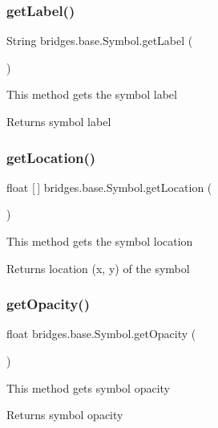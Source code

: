 \subsubsection{\texorpdfstring{getLabel()}{getLabel()}}
{\footnotesize\ttfamily String bridges.\+base.\+Symbol.\+get\+Label (\begin{DoxyParamCaption}{ }\end{DoxyParamCaption})}

This method gets the symbol label

\begin{DoxyReturn}{Returns}
symbol label 
\end{DoxyReturn}
\mbox{\label{classbridges_1_1base_1_1_symbol_a67d925fa6fcf9b78c449b63182029e56}} 
\subsubsection{\texorpdfstring{getLocation()}{getLocation()}}
{\footnotesize\ttfamily float \mbox{[}$\,$\mbox{]} bridges.\+base.\+Symbol.\+get\+Location (\begin{DoxyParamCaption}{ }\end{DoxyParamCaption})}

This method gets the symbol location

\begin{DoxyReturn}{Returns}
location (x, y) of the symbol 
\end{DoxyReturn}
\mbox{\label{classbridges_1_1base_1_1_symbol_af249b2a8a11a70edc8f51ee19e6cd927}} 
\subsubsection{\texorpdfstring{getOpacity()}{getOpacity()}}
{\footnotesize\ttfamily float bridges.\+base.\+Symbol.\+get\+Opacity (\begin{DoxyParamCaption}{ }\end{DoxyParamCaption})}

This method gets symbol opacity

\begin{DoxyReturn}{Returns}
symbol opacity 
\end{DoxyReturn}
\mbox{\label{classbridges_1_1base_1_1_symbol_a10f3cde5331f1af9303b08249e719a9d}} 
